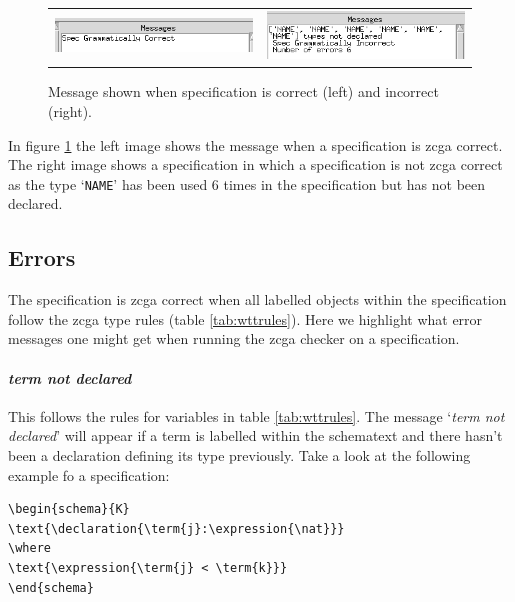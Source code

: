 \begin{figure}[H]
\begin{tabular}{c c}
\includegraphics[width=7cm]{Figures/zcga/zcgacorrect.png} 
& \includegraphics[width=7cm]{Figures/zcga/zcgaincorrect.png}
\end{tabular}
\caption{Message shown when specification is correct (left) and incorrect (right).\label{fig:correctandincorrect}}
\end{figure}

In figure \ref{fig:correctandincorrect} the left image shows the message when a
specification is \gls{zcga} correct. The right image shows a specification in
which a specification is not \gls{zcga} correct as the type `\texttt{NAME}' has
been used 6 times in the specification but has not been declared.

\subsection{Errors}
\label{subsec:zcgaerrors}

The specification is \gls{zcga} correct when all labelled objects within the
specification follow the \gls{zcga} type rules (table \ref{tab:wttrules}). Here
we highlight what error messages one might get when running the \gls{zcga}
checker on a specification.


\paragraph{\emph{term not declared}}

This follows the rules for variables in table \ref{tab:wttrules}. The message
`\emph{term not declared}' will appear if a term is labelled within the
schematext and there hasn't been a declaration defining its type previously.
Take a look at the following example fo a specification:

\begin{exam}
\label{Kexam}
\begin{verbatim}
\begin{schema}{K}
\text{\declaration{\term{j}:\expression{\nat}}}
\where
\text{\expression{\term{j} < \term{k}}}
\end{schema}
\end{verbatim}
\end{exam}

